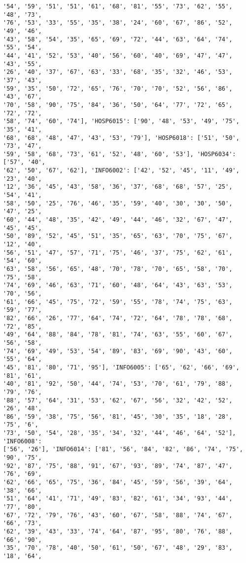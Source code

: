 \documentclass[11pt]{article}
\begin{document}
\begin{Verbatim}[commandchars=\\\{\}]
'54', '59', '51', '51', '61', '68', '81', '55', '73', '62', '55', '48', '73',
'76', '53', '33', '55', '35', '38', '24', '60', '67', '86', '52', '49', '46',
'43', '58', '54', '35', '65', '69', '72', '44', '63', '64', '74', '55', '54',
'44', '41', '52', '53', '40', '56', '60', '40', '69', '47', '47', '43', '55',
'26', '40', '37', '67', '63', '33', '68', '35', '32', '46', '53', '37', '43',
'59', '35', '50', '72', '65', '76', '70', '70', '52', '56', '86', '43', '67',
'70', '58', '90', '75', '84', '36', '50', '64', '77', '72', '65', '72', '72',
'58', '74', '60', '74'], 'HOSP6015': ['90', '48', '53', '49', '75', '35', '41',
'68', '68', '48', '47', '43', '53', '79'], 'HOSP6018': ['51', '50', '73', '47',
'59', '58', '68', '73', '61', '52', '48', '60', '53'], 'HOSP6034': ['57', '40',
'62', '50', '67', '62'], 'INFO6002': ['42', '52', '45', '11', '49', '23', '40',
'12', '36', '45', '43', '58', '36', '37', '68', '68', '57', '25', '54', '41',
'58', '50', '25', '76', '46', '35', '59', '40', '30', '30', '50', '47', '25',
'60', '44', '48', '35', '42', '49', '44', '46', '32', '67', '47', '45', '45',
'50', '89', '52', '45', '51', '35', '65', '63', '70', '75', '67', '12', '40',
'56', '51', '47', '57', '71', '75', '46', '37', '75', '62', '61', '54', '60',
'63', '58', '56', '65', '48', '70', '78', '70', '65', '58', '70', '75', '58',
'74', '69', '46', '63', '71', '60', '48', '64', '43', '63', '53', '70', '56',
'61', '66', '45', '75', '72', '59', '55', '78', '74', '75', '63', '59', '77',
'82', '66', '26', '77', '64', '74', '72', '64', '78', '78', '68', '72', '85',
'49', '64', '88', '84', '78', '81', '74', '63', '55', '60', '67', '56', '58',
'74', '69', '49', '53', '54', '89', '83', '69', '90', '43', '60', '55', '64',
'45', '81', '80', '71', '95'], 'INFO6005': ['65', '62', '66', '69', '81', '61',
'40', '81', '92', '50', '44', '74', '53', '70', '61', '79', '88', '79', '76',
'88', '57', '64', '31', '53', '62', '67', '56', '32', '42', '52', '26', '48',
'86', '59', '38', '75', '56', '81', '45', '30', '35', '18', '28', '75', '6',
'73', '50', '54', '28', '35', '34', '32', '44', '46', '64', '52'], 'INFO6008':
['56', '26'], 'INFO6014': ['81', '56', '84', '82', '86', '74', '75', '90', '75',
'92', '87', '75', '88', '91', '67', '93', '89', '74', '87', '47', '76', '69',
'62', '66', '65', '75', '36', '84', '45', '59', '56', '39', '64', '38', '66',
'51', '64', '41', '71', '49', '83', '82', '61', '34', '93', '44', '77', '80',
'67', '72', '79', '76', '43', '60', '67', '58', '88', '74', '67', '66', '73',
'62', '39', '43', '33', '74', '64', '87', '95', '80', '76', '88', '66', '90',
'35', '70', '78', '40', '50', '61', '50', '67', '48', '29', '83', '18', '64',

\end{Verbatim}
\end{document}
